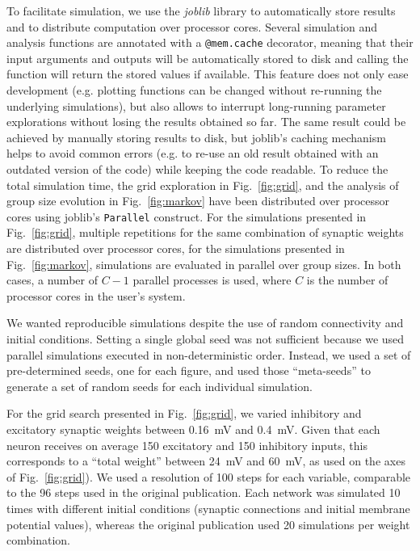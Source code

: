 \documentclass[10pt,a4paper,onecolumn]{article}
\begin{document}
To facilitate simulation, we use the \emph{joblib} library to automatically store results and to distribute computation over processor cores. Several simulation and analysis functions are annotated with a \verb|@mem.cache| decorator, meaning that their input arguments and outputs will be automatically stored to disk and calling the function will return the stored values if available. This feature does not only ease development (e.g. plotting functions can be changed without re-running the underlying simulations), but also allows to interrupt long-running parameter explorations without losing the results obtained so far. The same result could be achieved by manually storing results to disk, but joblib's caching mechanism helps to avoid common errors (e.g. to re-use an old result obtained with an outdated version of the code) while keeping the code readable. To reduce the total simulation time, the grid exploration in Fig.~\ref{fig:grid}, and the analysis of group size evolution in Fig.~\ref{fig:markov} have been distributed over processor cores using joblib's \verb|Parallel| construct. For the simulations presented in Fig.~\ref{fig:grid}, multiple repetitions for the same combination of synaptic weights are distributed over processor cores, for the simulations presented in Fig.~\ref{fig:markov}, simulations are evaluated in parallel over group sizes. In both cases, a number of $C-1$ parallel processes is used, where $C$ is the number of processor cores in the user's system.

We wanted reproducible simulations despite the use of random connectivity and initial conditions. Setting a single global seed was not sufficient because we used parallel simulations executed in non-deterministic order. Instead, we used a set of pre-determined seeds, one for each figure, and used those ``meta-seeds'' to generate a set of random seeds for each individual simulation.

For the grid search presented in Fig.~\ref{fig:grid}, we varied inhibitory and excitatory synaptic weights between \SI{0.16}{\milli\volt} and \SI{0.4}{\milli\volt}. Given that each neuron receives on average 150 excitatory and 150 inhibitory inputs, this corresponds to a ``total weight'' between \SI{24}{\milli\volt} and \SI{60}{\milli\volt}, as used on the axes of Fig.~\ref{fig:grid}). We used a resolution of 100 steps for each variable, comparable to the 96 steps used in the original publication. Each network was simulated 10 times with different initial conditions (synaptic connections and initial membrane potential values), whereas the original publication used 20 simulations per weight combination.
\end{document}
